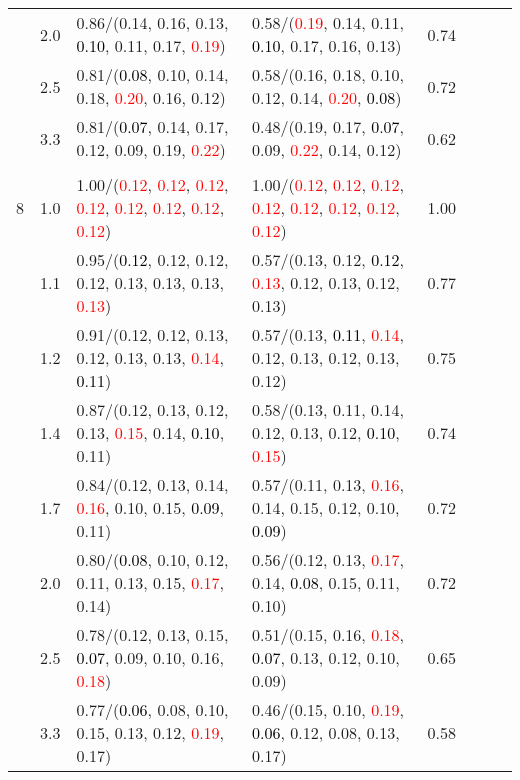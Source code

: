 \documentclass[10pt,a4paper]{report}
\begin{document}
\begin{table}[!htbp]
\begin{center}
{\begin{tabular}{ccllcccc}
			&2.0&0.86/(0.14, 0.16, 0.13, \textcolor{black}{0.10}, 0.11, 0.17, \textcolor{red}{0.19})&0.58/(\textcolor{red}{0.19}, 0.14, 0.11, \textcolor{black}{0.10}, 0.17, 0.16, 0.13)&0.74\\
			&2.5&0.81/(\textcolor{black}{0.08}, 0.10, 0.14, 0.18, \textcolor{red}{0.20}, 0.16, 0.12)&0.58/(0.16, 0.18, 0.10, 0.12, 0.14, \textcolor{red}{0.20}, \textcolor{black}{0.08})&0.72\\
			&3.3&0.81/(\textcolor{black}{0.07}, 0.14, 0.17, 0.12, 0.09, 0.19, \textcolor{red}{0.22})&0.48/(0.19, 0.17, \textcolor{black}{0.07}, 0.09, \textcolor{red}{0.22}, 0.14, 0.12)&0.62\\
			&&&&\\
			8			&1.0&1.00/(\textcolor{red}{0.12}, \textcolor{red}{0.12}, \textcolor{red}{0.12}, \textcolor{red}{0.12}, \textcolor{red}{0.12}, \textcolor{red}{0.12}, \textcolor{red}{0.12}, \textcolor{red}{0.12})&1.00/(\textcolor{red}{0.12}, \textcolor{red}{0.12}, \textcolor{red}{0.12}, \textcolor{red}{0.12}, \textcolor{red}{0.12}, \textcolor{red}{0.12}, \textcolor{red}{0.12}, \textcolor{red}{0.12})&1.00\\
			&1.1&0.95/(\textcolor{black}{0.12}, 0.12, 0.12, 0.12, 0.13, 0.13, 0.13, \textcolor{red}{0.13})&0.57/(0.13, 0.12, \textcolor{black}{0.12}, \textcolor{red}{0.13}, 0.12, 0.13, 0.12, 0.13)&0.77\\
			&1.2&0.91/(0.12, 0.12, 0.13, 0.12, 0.13, 0.13, \textcolor{red}{0.14}, \textcolor{black}{0.11})&0.57/(0.13, \textcolor{black}{0.11}, \textcolor{red}{0.14}, 0.12, 0.13, 0.12, 0.13, 0.12)&0.75\\
			&1.4&0.87/(0.12, 0.13, 0.12, 0.13, \textcolor{red}{0.15}, 0.14, \textcolor{black}{0.10}, 0.11)&0.58/(0.13, 0.11, 0.14, 0.12, 0.13, 0.12, \textcolor{black}{0.10}, \textcolor{red}{0.15})&0.74\\
			&1.7&0.84/(0.12, 0.13, 0.14, \textcolor{red}{0.16}, 0.10, 0.15, \textcolor{black}{0.09}, 0.11)&0.57/(0.11, 0.13, \textcolor{red}{0.16}, 0.14, 0.15, 0.12, 0.10, \textcolor{black}{0.09})&0.72\\
			&2.0&0.80/(\textcolor{black}{0.08}, 0.10, 0.12, 0.11, 0.13, 0.15, \textcolor{red}{0.17}, 0.14)&0.56/(0.12, 0.13, \textcolor{red}{0.17}, 0.14, \textcolor{black}{0.08}, 0.15, 0.11, 0.10)&0.72\\
			&2.5&0.78/(0.12, 0.13, 0.15, \textcolor{black}{0.07}, 0.09, 0.10, 0.16, \textcolor{red}{0.18})&0.51/(0.15, 0.16, \textcolor{red}{0.18}, \textcolor{black}{0.07}, 0.13, 0.12, 0.10, 0.09)&0.65\\
			&3.3&0.77/(\textcolor{black}{0.06}, 0.08, 0.10, 0.15, 0.13, 0.12, \textcolor{red}{0.19}, 0.17)&0.46/(0.15, 0.10, \textcolor{red}{0.19}, \textcolor{black}{0.06}, 0.12, 0.08, 0.13, 0.17)&0.58\\
			\bottomrule
		\end{tabular}}
	\end{center}
\end{table}
\end{document}
